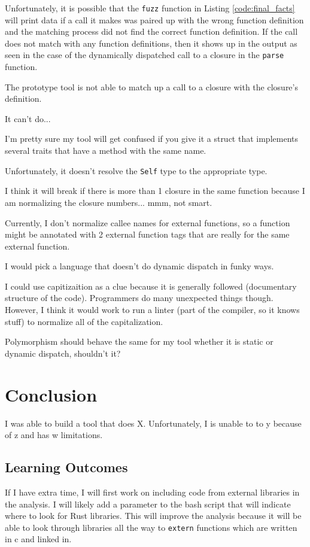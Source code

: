 \documentclass[11pt]{article}
\begin{document}
Unfortunately, it is possible that the \lstinline{fuzz} function in Listing \ref{code:final_facts} will print data if a call it makes was paired up with the wrong function definition and the matching process did not find the correct function definition.
If the call does not match with any function definitions, then it shows up in the output as seen in the case of the dynamically dispatched call to a closure in the \lstinline{parse} function.

The prototype tool is not able to match up a call to a closure with the closure's definition.

It can't do...

I'm pretty sure my tool will get confused if you give it a struct that implements several traits that have a method with the same name.

Unfortunately, it doesn't resolve the \lstinline{Self} type to the appropriate type.

I think it will break if there is more than 1 closure in the same function because I am normalizing the closure numbers... mmm, not smart.

Currently, I don't normalize callee names for external functions, so a function might be annotated with 2 external function tags that are really for the same external function.

I would pick a language that doesn't do dynamic dispatch in funky ways.

I could use capitizaition as a clue because it is generally followed (documentary structure of the code).
Programmers do many unexpected things though.
However, I think it would work to run a linter (part of the compiler, so it knows stuff) to normalize all of the capitalization.

Polymorphism should behave the same for my tool whether it is static or dynamic dispatch, shouldn't it?

\section{Conclusion}
I was able to build a tool that does X.
Unfortunately, I is unable to to y because of z and has w limitations.

\subsection{Learning Outcomes}
If I have extra time, I will first work on including code from external libraries in the analysis.
I will likely add a parameter to the bash script that will indicate where to look for Rust libraries.
This will improve the analysis because it will be able to look through libraries all the way to \lstinline{extern} functions which are written in c and linked in.
\end{document}
